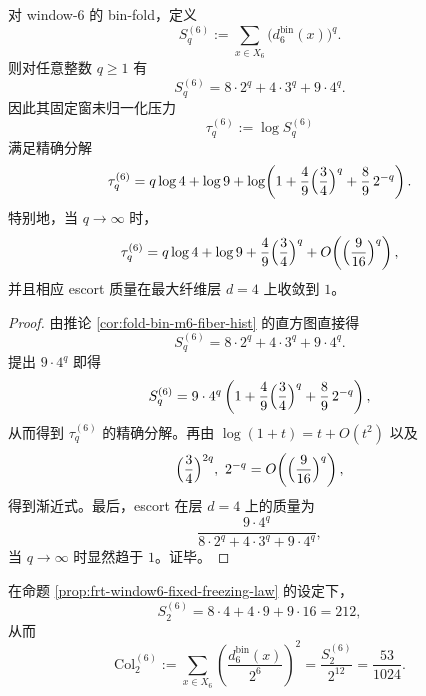 \begin{proposition}\label{prop:frt-window6-fixed-freezing-law}
对 window-\(6\) 的 bin-fold，定义
\[
S_q^{(6)}:=\sum_{x\in X_6}\bigl(d_6^{\mathrm{bin}}(x)\bigr)^q.
\]
则对任意整数 \(q\ge 1\) 有
\[
S_q^{(6)}=8\cdot 2^q+4\cdot 3^q+9\cdot 4^q.
\]
因此其固定窗未归一化压力
\[
\tau_q^{(6)}:=\log S_q^{(6)}
\]
满足精确分解
\[
\tau_q^{(6)}
=
q\log 4+\log 9
+\log\!\left(
1+\frac{4}{9}\Bigl(\frac{3}{4}\Bigr)^q+\frac{8}{9}\,2^{-q}
\right).
\]
特别地，当 \(q\to\infty\) 时，
\[
\tau_q^{(6)}
=
q\log 4+\log 9
+\frac{4}{9}\Bigl(\frac{3}{4}\Bigr)^q
+O\!\left(\Bigl(\frac{9}{16}\Bigr)^q\right),
\]
并且相应 escort 质量在最大纤维层 \(d=4\) 上收敛到 \(1\)。
\end{proposition}
\begin{proof}
由推论 \ref{cor:fold-bin-m6-fiber-hist} 的直方图直接得
\[
S_q^{(6)}=8\cdot 2^q+4\cdot 3^q+9\cdot 4^q.
\]
提出 \(9\cdot 4^q\) 即得
\[
S_q^{(6)}
=
9\cdot 4^q
\left(
1+\frac{4}{9}\Bigl(\frac{3}{4}\Bigr)^q+\frac{8}{9}\,2^{-q}
\right),
\]
从而得到 \(\tau_q^{(6)}\) 的精确分解。再由 \(\log(1+t)=t+O(t^2)\) 以及
\[
\Bigl(\frac{3}{4}\Bigr)^{2q},\ 2^{-q}
=
O\!\left(\Bigl(\frac{9}{16}\Bigr)^q\right),
\]
得到渐近式。最后，escort 在层 \(d=4\) 上的质量为
\[
\frac{9\cdot 4^q}{8\cdot 2^q+4\cdot 3^q+9\cdot 4^q},
\]
当 \(q\to\infty\) 时显然趋于 \(1\)。证毕。
\end{proof}

\begin{corollary}\label{cor:frt-window6-second-collision-constant}
在命题 \ref{prop:frt-window6-fixed-freezing-law} 的设定下，
\[
S_2^{(6)}=8\cdot 4+4\cdot 9+9\cdot 16=212,
\]
从而
\[
\mathrm{Col}^{(6)}_2
:=
\sum_{x\in X_6}\left(\frac{d_6^{\mathrm{bin}}(x)}{2^6}\right)^2
=
\frac{S_2^{(6)}}{2^{12}}
=
\frac{53}{1024}.
\]
\end{corollary}

